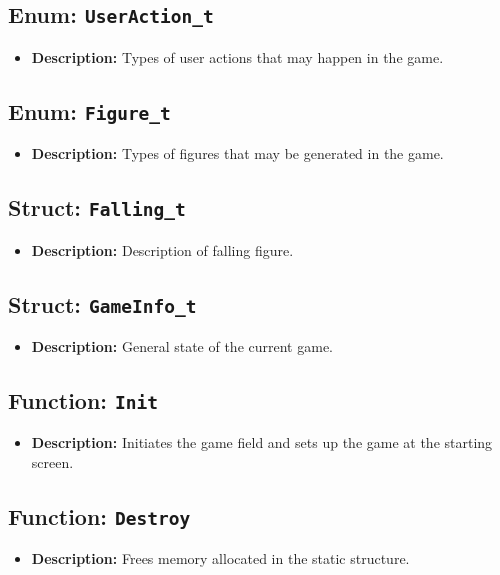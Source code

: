 \documentclass{article}
\begin{document}
\subsection{Enum: \texttt{UserAction\_t}}
\begin{itemize}
    \item \textbf{Description:} Types of user actions that may happen in the game.
\end{itemize}

\subsection{Enum: \texttt{Figure\_t}}
\begin{itemize}
    \item \textbf{Description:} Types of figures that may be generated in the game.
\end{itemize}

\subsection{Struct: \texttt{Falling\_t}}
\begin{itemize}
    \item \textbf{Description:} Description of falling figure.
\end{itemize}

\subsection{Struct: \texttt{GameInfo\_t}}
\begin{itemize}
    \item \textbf{Description:} General state of the current game.
\end{itemize}

\subsection{Function: \texttt{Init}}
\begin{itemize}
    \item \textbf{Description:} Initiates the game field and sets up the game at the starting screen.
\end{itemize}

\subsection{Function: \texttt{Destroy}}
\begin{itemize}
    \item \textbf{Description:} Frees memory allocated in the static structure.
\end{itemize}
\end{document}
